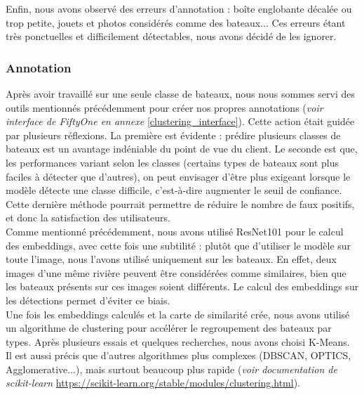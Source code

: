Enfin, nous avons observé des erreurs d'annotation : boîte englobante décalée ou trop petite,
jouets et photos considérés comme des bateaux... Ces erreurs étant très ponctuelles et difficilement
détectables, nous avons décidé de les ignorer.\\

\subsubsection{Annotation}

Après avoir travaillé sur une seule classe de bateaux, nous nous sommes servi des outils mentionnés précédemment
pour créer nos propres annotations (\textit{voir interface de FiftyOne en annexe }\ref{clustering_interface}).
Cette action était guidée par plusieurs réflexions. La première est évidente :
prédire plusieurs classes de bateaux est un avantage indéniable du point de vue du client.
Le seconde est que, les performances variant selon les classes (certains types de bateaux sont plus faciles à
détecter que d'autres), on peut envisager d'être plus exigeant lorsque le modèle détecte une classe difficile,
c'est-à-dire augmenter le seuil de confiance. Cette dernière méthode pourrait permettre de réduire
le nombre de faux positifs, et donc la satisfaction des utilisateurs.\\

Comme mentionné précédemment, nous avons utilisé ResNet101 pour le calcul des embeddings,
avec cette fois une subtilité : plutôt que d'utiliser le modèle sur toute l'image, nous
l'avons utilisé uniquement sur les bateaux. En effet, deux images d'une même rivière
peuvent être considérées comme similaires, bien que les bateaux présents sur ces images
soient différents. Le calcul des embeddings sur les détections permet d'éviter ce biais.\\

Une fois les embeddings calculés et la carte de similarité crée, nous avons utilisé un algorithme
de clustering pour accélérer le regroupement des bateaux par types. Après plusieurs essais et quelques recherches\cite{Xu_Tian_2015}\cite{Yin_Aryani_Petrie_Nambissan_Astudillo_Cao_2024}, nous avons choisi K-Means. Il est aussi précis que d'autres algorithmes plus complexes (DBSCAN,
OPTICS, Agglomerative...), mais surtout beaucoup plus rapide (\textit{voir documentation
de scikit-learn }\url{https://scikit-learn.org/stable/modules/clustering.html}).


